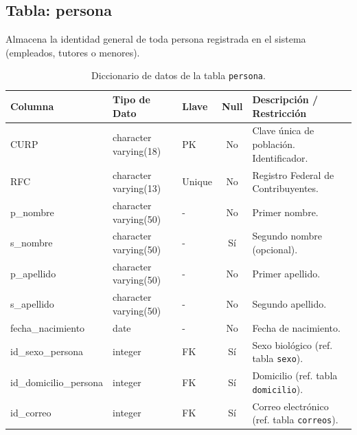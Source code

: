 \subsection{Tabla: persona}
Almacena la identidad general de toda persona registrada en el sistema (empleados, tutores o menores).
\begin{table}[htbp!]
\centering
\begin{tabular}{|l|l|l|c|l|}
\hline
\textbf{Columna} & \textbf{Tipo de Dato} & \textbf{Llave} & \textbf{Null} & \textbf{Descripción / Restricción} \\
\hline
CURP & character varying(18) & PK & No & Clave única de población. Identificador. \\
RFC & character varying(13) & Unique & No & Registro Federal de Contribuyentes. \\
p\_nombre & character varying(50) & - & No & Primer nombre. \\
s\_nombre & character varying(50) & - & Sí & Segundo nombre (opcional). \\
p\_apellido & character varying(50) & - & No & Primer apellido. \\
s\_apellido & character varying(50) & - & No & Segundo apellido. \\
fecha\_nacimiento & date & - & No & Fecha de nacimiento. \\
id\_sexo\_persona & integer & FK & Sí & Sexo biológico (ref. tabla \texttt{sexo}). \\
id\_domicilio\_persona & integer & FK & Sí & Domicilio (ref. tabla \texttt{domicilio}). \\
id\_correo & integer & FK & Sí & Correo electrónico (ref. tabla \texttt{correos}). \\
\hline
\end{tabular}
\caption{Diccionario de datos de la tabla \texttt{persona}.}
\label{tbl:diccionarioPersona}
\end{table}

